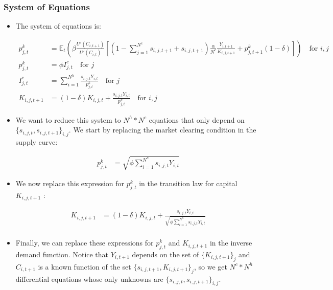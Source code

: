 \documentclass[11pt]{article}
\newcommand{\E}{\mathbb{E}}
\numberwithin{equation}{section}
\begin{document}
	\subsubsection{System of Equations}
	
	\begin{itemize}


	\item The system of equations is:
	
	\begin{align*}
		p^k_{j,t}  & =   \E_t \left( \beta \frac{U'(C_{i,t+1})}{U'(C_{i,t})} \left[ (1-\sum_{j=1}^{N^c} s_{i,j,t+1} + s_{i,j,t+1}) \frac{\alpha}{N^c} \frac{Y_{i,t+1}}{K_{i,j,t+1}} + p^k_{j,t+1} (1-\delta)  \right]  \right) \quad \text{for } i,j \\
		 p^k_{j,t} & = \phi I^c_{j,t} \quad \text{for } j\\
		I_{j,t}^c & = \sum_{i=1}^{N^h} \frac{ s_{i,j,t} Y_{i,t} }{p^k_{j,t}}  \quad \text{for } j\\
		K_{i,j,t+1} & = (1-\delta) K_{i,j,t} + \frac{s_{i,j,t} Y_{i,t}}{p^k_{j,t}} \quad \text{for } i,j
	\end{align*}
	
	\item We want to reduce this system to $N^h*N^c$ equations that only depend on $\{s_{i,j,t}, s_{i,j,t+1}\}_{i,j}$. We start by replacing the market clearing condition in the supply curve:
	
	\begin{align*}
	p^k_{j,t} & = \sqrt{\phi \sum_{i=1}^{N^h}  s_{i,j,t} Y_{i,t}}
	\end{align*}
	
	\item We now replace this expression for $p^k_{j,t}$ in the transition law for capital $K_{i,j,t+1}$ :
	
	\begin{align}
	K_{i,j,t+1} & = (1-\delta) K_{i,j,t} + \frac{s_{i,j,t} Y_{i,t}}{ \sqrt{\phi \sum_{i=1}^{N^h}  s_{i,j,t} Y_{i,t}}} \\
	\end{align}
	
	\item Finally, we can replace these expressions for $p^k_{j,t}$ and $K_{i,j,t+1}$ in the inverse demand function. Notice that $Y_{i,t+1}$ depends on the set of $\{K_{i,j,t+1}\}_j$ and $C_{i,t+1}$ is a known function of the set $\{s_{i,j,t+1}, K_{i,j,t+1}\}_j$, so we get $N^c*N^h$ differential equations whose only unknowns are $\{s_{i,j,t}, s_{i,j,t+1}\}_{i,j}$.
	

\end{itemize}
\end{document}
